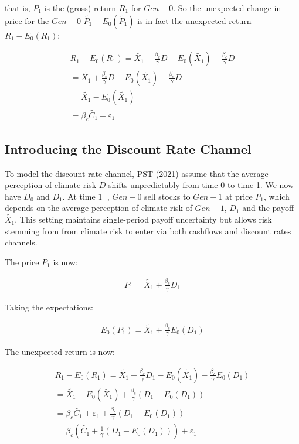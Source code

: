 that is, $P_1$ is the (gross) return
$R_1$ for $Gen-0$.
So the unexpected change in price 
for the $Gen-0$ $\tilde{P_1} - E_0(\tilde{P_1})$ is in fact
the unexpected return $R_1 - E_0(R_1)$:

\begin{equation}
    \begin{aligned}
    R_1 - E_0(R_1) = \tilde{X_1} + \frac{\beta_{c}}{\gamma}D - E_0(\tilde{X_1}) - \frac{\beta_{c}}{\gamma}D \\
    = \tilde{X_1} + \frac{\beta_{c}}{\gamma}D - E_0(\tilde{X_1}) - \frac{\beta_{c}}{\gamma}D \\
    = \tilde{X_1} - E_0(\tilde{X_1}) \\
    = \beta_{c} \tilde{C_1} + \varepsilon_1
    \end{aligned}
\end{equation}

\subsection{Introducing the Discount Rate Channel}

To model the discount rate channel, PST (2021)
assume that the average perception of climate risk 
$D$ shifts unpredictably from time 0 
to time 1. We now have $D_0$ and $D_1$.
At time $1^{-}$, $Gen-0$ sell stocks 
to $Gen-1$ at price $P_1$, which depends 
on the average perception of climate risk
of $Gen-1$, $D_1$ and the payoff $\tilde{X_1}$.
This setting maintains single-period 
payoff uncertainty but allows risk
stemming from from climate risk to enter 
via both cashflows and discount rates 
channels.

The price $P_1$ is now:

\begin{equation}
    \begin{aligned}
    P_1 = \tilde{X_1} + \frac{\beta_{c}}{\gamma}D_1
    \end{aligned}
\end{equation}

Taking the expectations:

\begin{equation}
    \begin{aligned}
    E_0(P_1) = \tilde{X_1} + \frac{\beta_{c}}{\gamma}E_0(D_1) 
    \end{aligned}
\end{equation}

The unexpected return is now:

\begin{equation}
    \begin{aligned}
    R_1 - E_0(R_1) = \tilde{X_1} + \frac{\beta_{c}}{\gamma}D_1 - E_0(\tilde{X_1}) - \frac{\beta_{c}}{\gamma}E_0(D_1) \\
    = \tilde{X_1} - E_0(\tilde{X_1}) + \frac{\beta_{c}}{\gamma}(D_1 - E_0(D_1)) \\
    = \beta_{c} \tilde{C_1} + \varepsilon_1 + \frac{\beta_{c}}{\gamma}(D_1 - E_0(D_1)) \\
    = \beta_{c}(\tilde{C_1} + \frac{1}{\gamma}(D_1 - E_0(D_1))) + \varepsilon_1
    \end{aligned}
\end{equation}

